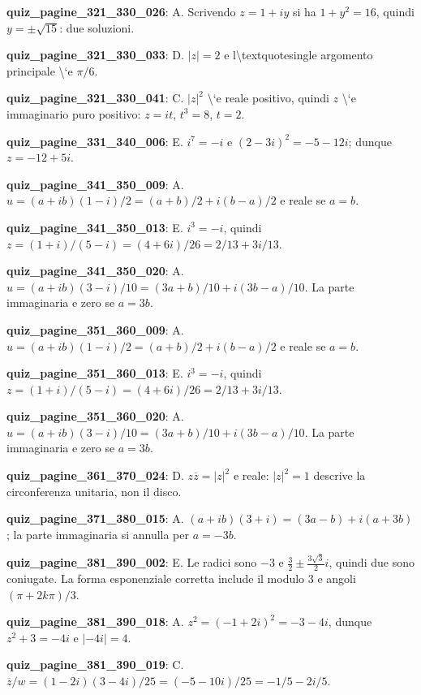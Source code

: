 \documentclass[11pt,a4paper]{article}
\newcounter{quiz}
\begin{document}
\noindent\textbf{quiz\_pagine\_321\_330\_026}: A. Scrivendo $z=1+iy$ si ha $1+y^2=16$, quindi $y=\pm\sqrt{15}$: due soluzioni.\par\medskip
\noindent\textbf{quiz\_pagine\_321\_330\_033}: D. $|z|=2$ e l\textbackslash{}textquotesingle argomento principale \textbackslash{}`e $\pi/6$.\par\medskip
\noindent\textbf{quiz\_pagine\_321\_330\_041}: C. $|z|^2$ \textbackslash{}`e reale positivo, quindi $z$ \textbackslash{}`e immaginario puro positivo: $z=it$, $t^3=8$, $t=2$.\par\medskip
\noindent\textbf{quiz\_pagine\_331\_340\_006}: E. $i^7=-i$ e $(2-3i)^2=-5-12i$; dunque $z=-12+5i$.\par\medskip
\noindent\textbf{quiz\_pagine\_341\_350\_009}: A. $u=(a+ib)(1-i)/2=(a+b)/2+i(b-a)/2$ e reale se $a=b$.\par\medskip
\noindent\textbf{quiz\_pagine\_341\_350\_013}: E. $i^3=-i$, quindi $z=(1+i)/(5-i)=(4+6i)/26=2/13+3i/13$.\par\medskip
\noindent\textbf{quiz\_pagine\_341\_350\_020}: A. $u=(a+ib)(3-i)/10=(3a+b)/10+i(3b-a)/10$. La parte immaginaria e zero se $a=3b$.\par\medskip
\noindent\textbf{quiz\_pagine\_351\_360\_009}: A. $u=(a+ib)(1-i)/2=(a+b)/2+i(b-a)/2$ e reale se $a=b$.\par\medskip
\noindent\textbf{quiz\_pagine\_351\_360\_013}: E. $i^3=-i$, quindi $z=(1+i)/(5-i)=(4+6i)/26=2/13+3i/13$.\par\medskip
\noindent\textbf{quiz\_pagine\_351\_360\_020}: A. $u=(a+ib)(3-i)/10=(3a+b)/10+i(3b-a)/10$. La parte immaginaria e zero se $a=3b$.\par\medskip
\noindent\textbf{quiz\_pagine\_361\_370\_024}: D. $z\overline z=|z|^2$ e reale: $|z|^2=1$ descrive la circonferenza unitaria, non il disco.\par\medskip
\noindent\textbf{quiz\_pagine\_371\_380\_015}: A. $(a+ib)(3+i)=(3a-b)+i(a+3b)$; la parte immaginaria si annulla per $a=-3b$.\par\medskip
\noindent\textbf{quiz\_pagine\_381\_390\_002}: E. Le radici sono $-3$ e $\frac32\pm\frac{3\sqrt3}{2}i$, quindi due sono coniugate. La forma esponenziale corretta include il modulo $3$ e angoli $(\pi+2k\pi)/3$.\par\medskip
\noindent\textbf{quiz\_pagine\_381\_390\_018}: A. $z^2=(-1+2i)^2=-3-4i$, dunque $z^2+3=-4i$ e $|-4i|=4$.\par\medskip
\noindent\textbf{quiz\_pagine\_381\_390\_019}: C. $\overline z/w=(1-2i)(3-4i)/25=(-5-10i)/25=-1/5-2i/5$.\par\medskip
\end{document}
